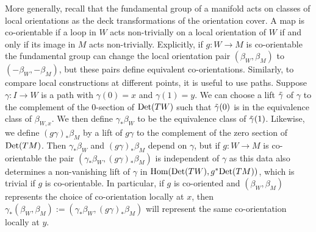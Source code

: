 More generally, recall that the fundamental group
of a manifold acts on classes of local orientations as the deck transformations of the orientation cover.
A map is co-orientable if a loop in $W$ acts non-trivially on a local orientation of $W$ if and only if
its image in $M$ acts non-trivially.
Explicitly, if $g:W\to M$ is co-orientable the fundamental group can change the local orientation pair
$(\beta_W, \beta_M)$ to $(-\beta_W, -\beta_M)$, but these pairs define equivalent co-orientations.
Similarly, to compare local constructions at different points, it is useful to use paths.
Suppose $\gamma:I\to W$ is a path with $\gamma(0)=x$ and $\gamma(1)=y$.
We can choose a lift $\tilde \gamma$ of $\gamma$ to the complement of the $0$-section of ${\rm Det}(TW)$ such that $\tilde \gamma(0)$ is in the equivalence class of $\beta_{W,x}$.
We then define $\gamma_*\beta_{W}$ to be the equivalence class of $\tilde \gamma(1)$.
Likewise, we define $(g\gamma)_*\beta_M$ by a lift of $g\gamma$ to the complement of the zero section of ${\rm Det}(TM)$.
Then $\gamma_*\beta_{W}$ and $(g\gamma)_*\beta_M$ depend on $\gamma$, but if $g:W\to M$ is co-orientable the pair $(\gamma_*\beta_{W}, (g\gamma)_*\beta_M)$ is independent of $\gamma$ as this data also determines a non-vanishing lift of $\gamma$ in $\textup{Hom}({\rm Det}(TW),g^*{\rm Det}(TM))$, which is trivial if $g$ is co-orientable.
In particular, if $g$ is co-oriented and $(\beta_{W}, \beta_M)$ represents the choice of co-orientation locally at $x$, then $\gamma_*(\beta_W,\beta_M):=(\gamma_*\beta_{W}, (g\gamma)_*\beta_M)$ will represent the same co-orientation locally at $y$.

